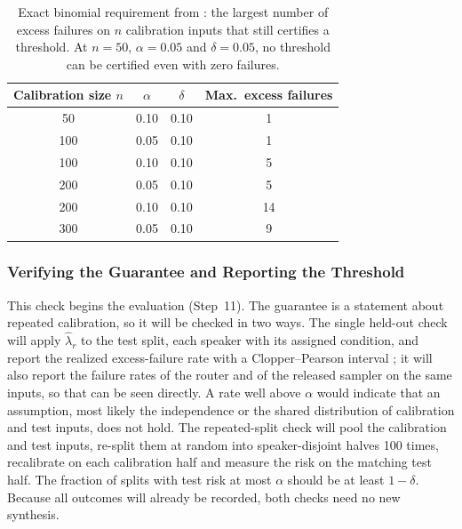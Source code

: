 \begin{table}[!htbp]
\centering\small
\caption{Exact binomial requirement from : the largest number of excess failures on $n$ calibration inputs that still certifies a threshold. At $n=50$, $\alpha=0.05$ and $\delta=0.05$, no threshold can be certified even with zero failures.}
\label{tab:samplesize}
\begin{tabular}{@{}cccc@{}}
\toprule
Calibration size $n$ & $\alpha$ & $\delta$ & Max.\ excess failures \\
\midrule
50 & 0.10 & 0.10 & 1 \\
100 & 0.05 & 0.10 & 1 \\
100 & 0.10 & 0.10 & 5 \\
200 & 0.05 & 0.10 & 5 \\
200 & 0.10 & 0.10 & 14 \\
300 & 0.05 & 0.10 & 9 \\
\bottomrule
\end{tabular}
\end{table}

\subsubsection{Verifying the Guarantee and Reporting the Threshold}
\label{sec:verify}

This check begins the evaluation (Step~11). The guarantee is a statement about repeated calibration, so it will be checked in two ways. The single held-out check will apply $\hat\lambda_r$ to the test split, each speaker with its assigned condition, and report the realized excess-failure rate with a Clopper--Pearson interval \parencite{clopper1934}; it will also report the failure rates of the router and of the released sampler on the same inputs, so that  can be seen directly. A rate well above $\alpha$ would indicate that an assumption, most likely the independence or the shared distribution of calibration and test inputs, does not hold. The repeated-split check will pool the calibration and test inputs, re-split them at random into speaker-disjoint halves 100 times, recalibrate on each calibration half and measure the risk on the matching test half. The fraction of splits with test risk at most $\alpha$ should be at least $1-\delta$. Because all outcomes will already be recorded, both checks need no new synthesis.

